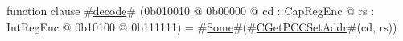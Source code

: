 function clause #\hyperref[sailMIPSzdecode]{decode}# (0b010010 @ 0b00000 @ cd : CapRegEnc @ rs : IntRegEnc @   0b10100 @ 0b111111) = #\hyperref[sailMIPSzSome]{Some}#(#\hyperref[sailMIPSzCGetPCCSetAddr]{CGetPCCSetAddr}#(cd, rs))
